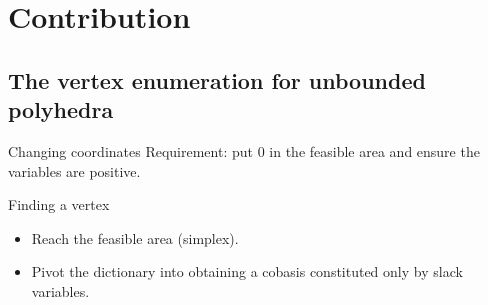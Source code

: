 \section{Contribution}
\subsection{The vertex enumeration for unbounded polyhedra}
\begin{frame}{Changing coordinates}
Requirement: put $0$ in the feasible area and ensure the variables are positive.

\vspace*{0.5cm}

\begin{block}{Finding a vertex}
\begin{itemize}
\item Reach the feasible area (simplex).
\item Pivot the dictionary into obtaining a cobasis constituted only by slack variables.
\end{itemize}
\end{block}

\end{frame}

